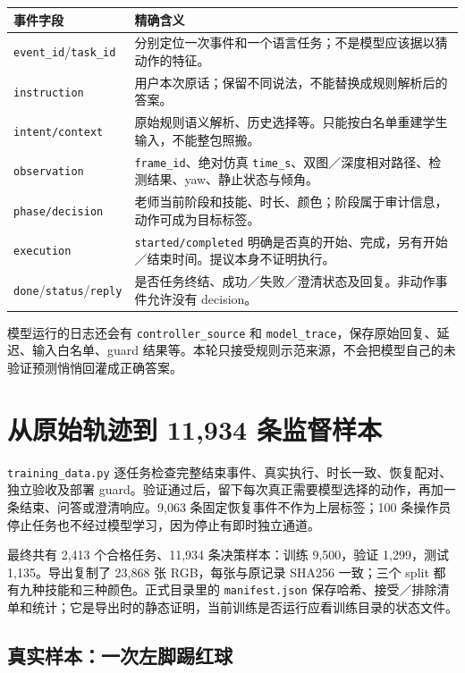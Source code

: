 \begin{longtable}{P{3.4cm}P{11.2cm}}
\hline
事件字段 & 精确含义\\
\hline
\endhead
\texttt{event\_id}/\allowbreak\texttt{task\_id} & 分别定位一次事件和一个语言任务；不是模型应该据以猜动作的特征。\\
\texttt{instruction} & 用户本次原话；保留不同说法，不能替换成规则解析后的答案。\\
\texttt{intent/context} & 原始规则语义解析、历史选择等。只能按白名单重建学生输入，不能整包照搬。\\
\texttt{observation} & \texttt{frame\_id}、绝对仿真 \texttt{time\_s}、双图／深度相对路径、检测结果、yaw、静止状态与倾角。\\
\texttt{phase/decision} & 老师当前阶段和技能、时长、颜色；阶段属于审计信息，动作可成为目标标签。\\
\texttt{execution} & \texttt{started/completed} 明确是否真的开始、完成，另有开始／结束时间。提议本身不证明执行。\\
\texttt{done}/\allowbreak\texttt{status}/\allowbreak\texttt{reply} & 是否任务终结、成功／失败／澄清状态及回复。非动作事件允许没有 decision。\\
\hline
\end{longtable}

模型运行的日志还会有 \texttt{controller\_source} 和 \texttt{model\_trace}，保存原始回复、延迟、输入白名单、guard 结果等。本轮只接受规则示范来源，不会把模型自己的未验证预测悄悄回灌成正确答案。

\section{从原始轨迹到 11,934 条监督样本}

\texttt{training\_data.py} 逐任务检查完整结束事件、真实执行、时长一致、恢复配对、独立验收及部署 guard。验证通过后，留下每次真正需要模型选择的动作，再加一条结束、问答或澄清响应。9,063 条固定恢复事件不作为上层标签；100 条操作员停止任务也不经过模型学习，因为停止有即时独立通道。

最终共有 2,413 个合格任务、11,934 条决策样本：训练 9,500，验证 1,299，测试 1,135。导出复制了 23,868 张 RGB，每张与原记录 SHA256 一致；三个 split 都有九种技能和三种颜色。正式目录里的 \texttt{manifest.json} 保存哈希、接受／排除清单和统计；它是导出时的静态证明，当前训练是否运行应看训练目录的状态文件。

\subsection{真实样本：一次左脚踢红球}

